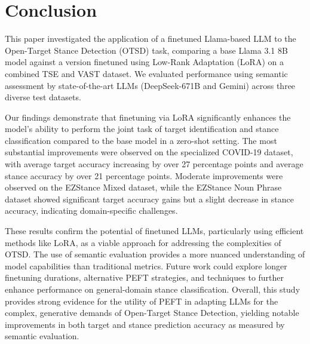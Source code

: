 \documentclass[twocolumn,11pt,letterpaper]{article}
\begin{document}
\section{Conclusion}
\label{sec:conclusion}

This paper investigated the application of a finetuned Llama-based LLM to the Open-Target Stance Detection (OTSD) task, comparing a base Llama 3.1 8B model against a version finetuned using Low-Rank Adaptation (LoRA) on a combined TSE and VAST dataset. We evaluated performance using semantic assessment by state-of-the-art LLMs (DeepSeek-671B and Gemini) across three diverse test datasets.

Our findings demonstrate that finetuning via LoRA significantly enhances the model's ability to perform the joint task of target identification and stance classification compared to the base model in a zero-shot setting. The most substantial improvements were observed on the specialized COVID-19 dataset, with average target accuracy increasing by over 27 percentage points and average stance accuracy by over 21 percentage points. Moderate improvements were observed on the EZStance Mixed dataset, while the EZStance Noun Phrase dataset showed significant target accuracy gains but a slight decrease in stance accuracy, indicating domain-specific challenges.

These results confirm the potential of finetuned LLMs, particularly using efficient methods like LoRA, as a viable approach for addressing the complexities of OTSD. The use of semantic evaluation provides a more nuanced understanding of model capabilities than traditional metrics. Future work could explore longer finetuning durations, alternative PEFT strategies, and techniques to further enhance performance on general-domain stance classification. Overall, this study provides strong evidence for the utility of PEFT in adapting LLMs for the complex, generative demands of Open-Target Stance Detection, yielding notable improvements in both target and stance prediction accuracy as measured by semantic evaluation.
\end{document}
